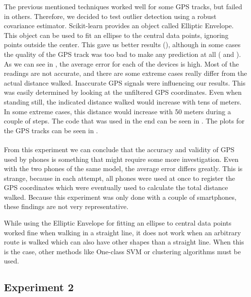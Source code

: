 The previous mentioned techniques worked well for some GPS tracks, but failed in others.
Therefore, we decided to test outlier detection using a robust covariance estimator.
Scikit-learn \cite{pedregosa2011scikit} provides an object called Elliptic Envelope.
This object can be used to fit an ellipse to the central data points, ignoring points outside the center.
This gave us better results (), although in some cases the quality of the GPS track was too bad to make any prediction at all ( and ). As we can see in , the average error for each of the devices is high.
Most of the readings are not accurate, and there are some extreme cases really differ from the actual distance walked.
Inaccurate GPS signals were influencing our results.
This was easily determined by looking at the unfiltered GPS coordinates.
Even when standing still, the indicated distance walked would increase with tens of meters.
In some extreme cases, this distance would increase with 50 meters during a couple of steps.
The code that was used in the end can be seen in . The plots for the GPS tracks can be seen in . \\\\
From this experiment we can conclude that the accuracy and validity of GPS used by phones is something that might require some more investigation.
Even with the two phones of the same model, the average error differs greatly.
This is strange, because in each attempt, all phones were used at once to register the GPS coordinates which were eventually used to calculate the total distance walked.
Because this experiment was only done with a couple of smartphones, these findings are not very representative.

While using the Elliptic Envelope for fitting an ellipse to central data points worked fine when walking in a straight line, it does not work when an arbitrary route is walked which can also have other shapes than a straight line. 
When this is the case, other methods like One-class SVM \cite{oneclasssvm} or clustering algorithms must be used.

\subsection{Experiment 2} \label{Experiment 2}
